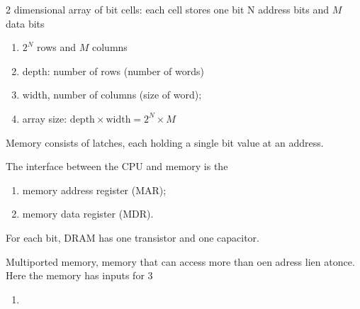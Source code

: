 2 dimensional array of bit cells: each cell stores one bit
N address bits and $M$ data bits
\begin{enumerate}
    \item $2^N$ rows and $M$ columns
    \item depth: number of rows (number of words)
    \item width, number of columns (size of word);
    \item array size: $\text{depth}\times\text{width}=2^N\times M$
\end{enumerate}

\begin{definition}
    Memory consists of latches, each holding a single bit value at an address.
\end{definition}

The interface between the CPU and memory is the
\begin{enumerate}
    \item memory address register (MAR);
    \item memory data register (MDR).
\end{enumerate}

\begin{definition}
    For each bit, DRAM has one transistor and one capacitor.
\end{definition}

\begin{definition}
    Multiported memory, memory that can access more than oen adress lien atonce. Here the memory has inputs for 3 
    \begin{enumerate}
        \item 
    \end{enumerate}
\end{definition}
